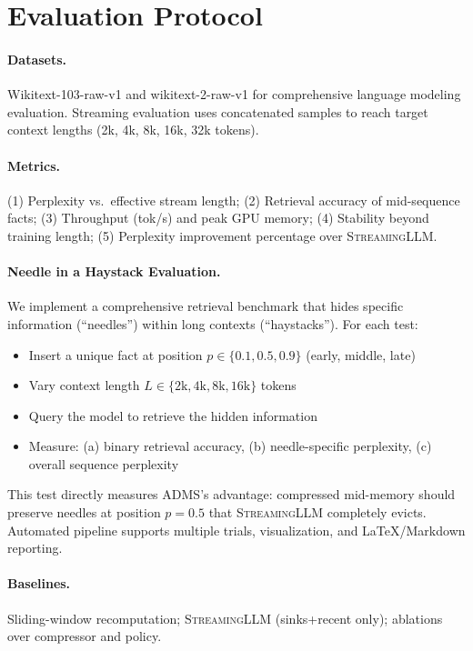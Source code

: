 \documentclass[11pt]{article}
\newcommand{\model}{\textsc{ADMS}} %
\newcommand{\streaming}{\textsc{StreamingLLM}}
\begin{document}
\section{Evaluation Protocol}

\paragraph{Datasets.}
Wikitext-103-raw-v1 and wikitext-2-raw-v1 for comprehensive language modeling evaluation. Streaming evaluation uses concatenated samples to reach target context lengths (2k, 4k, 8k, 16k, 32k tokens).

\paragraph{Metrics.}
(1) Perplexity vs.\ effective stream length; (2) Retrieval accuracy of mid-sequence facts; (3) Throughput (tok/s) and peak GPU memory; (4) Stability beyond training length; (5) Perplexity improvement percentage over \streaming{}.

\paragraph{Needle in a Haystack Evaluation.}
We implement a comprehensive retrieval benchmark that hides specific information (``needles'') within long contexts (``haystacks''). For each test:
\begin{itemize}
  \item Insert a unique fact at position $p \in \{0.1, 0.5, 0.9\}$ (early, middle, late)
  \item Vary context length $L \in \{2\text{k}, 4\text{k}, 8\text{k}, 16\text{k}\}$ tokens
  \item Query the model to retrieve the hidden information
  \item Measure: (a) binary retrieval accuracy, (b) needle-specific perplexity, (c) overall sequence perplexity
\end{itemize}
This test directly measures \model{}'s advantage: compressed mid-memory should preserve needles at position $p=0.5$ that \streaming{} completely evicts. Automated pipeline supports multiple trials, visualization, and LaTeX/Markdown reporting.

\paragraph{Baselines.}
Sliding-window recomputation; \streaming{} (sinks+recent only); ablations over compressor and policy.
\end{document}
